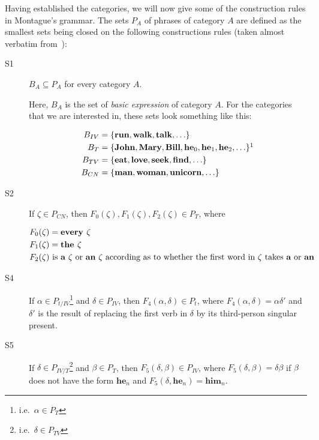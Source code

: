Having established the categories, we will now give some of the
construction rules in Montague's grammar. The sets $P_A$ of phrases of
category $A$ are defined as the smallest sets being closed on the following
constructions rules (taken almost verbatim from~\cite{montague1973proper}):

\begin{description}
\item[S1] $B_A \subseteq P_A$ for every category $A$.

  Here, $B_A$ is the set of \emph{basic expression} of category $A$. For
  the categories that we are interested in, these sets look something like
  this:

  \begin{align*}
    B_{IV} &= \{ \textbf{run}, \textbf{walk}, \textbf{talk}, \ldots \} \\
    B_{T} &= \{ \textbf{John}, \textbf{Mary}, \textbf{Bill}, \textbf{he}_0,
            \textbf{he}_1, \textbf{he}_2, \ldots \}\footnotemark \\
    B_{TV} &= \{ \textbf{eat}, \textbf{love}, \textbf{seek}, \textbf{find},
             \ldots \} \\
    B_{CN} &= \{ \textbf{man}, \textbf{woman}, \textbf{unicorn}, \ldots \}
  \end{align*}


\item[S2] If $\zeta \in P_{CN}$, then
  $F_0(\zeta), F_1(\zeta), F_2(\zeta) \in P_{T}$, where

  \begin{align*}
    F_0(\zeta) &= \textbf{every } \zeta \\
    F_1(\zeta) &= \textbf{the } \zeta \\
    F_2(\zeta) &\text{ is \textbf{a} $\zeta$ or \textbf{an} $\zeta$ according
    as to whether the first word in $\zeta$ takes \textbf{a} or \textbf{an}}
  \end{align*}

\item[S4] If $\alpha \in P_{t / IV}$\footnote{i.e.\ $\alpha \in P_{T}$}
  and $\delta \in P_{IV}$, then $F_4(\alpha, \delta) \in P_{t}$, where
  $F_4(\alpha, \delta) = \alpha \delta'$ and $\delta'$ is the result of
  replacing the first verb in $\delta$ by its third-person singular
  present.

\item[S5] If $\delta \in P_{IV / T}$\footnote{i.e.\ $\delta \in P_{TV}$}
  and $\beta \in P_{T}$, then $F_5(\delta, \beta) \in P_{IV}$, where
  $F_5(\delta, \beta) = \delta \beta$ if $\beta$ does not have the form
  $\textbf{he}_n$ and $F_5(\delta, \textbf{he}_n) = \textbf{him}_n$.


\end{description}
